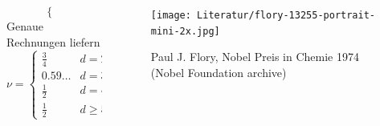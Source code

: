 \documentclass{beamer}
\begin{document}
{\begin{frame}
\begin{columns}[t]
\begin{column}{0.5\textwidth}
\begin{equation*}
\begin{cases}
				\end{cases}
			\end{equation*}
			Genaue Rechnungen liefern
			\begin{equation*}
				\nu=\left\{\begin{array}{ll}
					\frac{3}{4} & d=2 \\
					0.59 \ldots & d=3 \\
					\frac{1}{2} & d=4 \\
					\frac{1}{2} & d \geq 5
					\end{array}\right.
			\end{equation*}
		\end{column}
		\begin{column}{0.5\textwidth}
			\begin{figure}
				\centering
				\texttt{[image: Literatur/flory-13255-portrait-mini-2x.jpg]}
				\caption{Paul J. Flory, Nobel Preis in Chemie 1974 (Nobel Foundation archive)}
			\end{figure}
		\end{column}
	\end{columns}
\end{frame}
}
\end{document}
